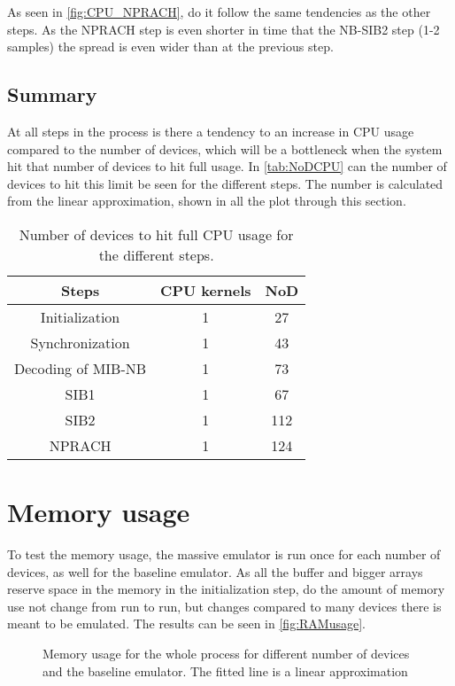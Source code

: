 As seen in \autoref{fig:CPU_NPRACH}, do it follow the same tendencies as the other steps. As the NPRACH step is even shorter in time that the  NB-SIB2 step (1-2 samples) the spread is even wider than at the previous step.

\subsection{Summary}
At all steps in the process is there a tendency to an increase in CPU usage compared to the number of devices, which will be a bottleneck when the system hit that number of devices to hit full usage. In \autoref{tab:NoDCPU} can the number of devices to hit this limit be seen for the different steps. The number is calculated from the linear approximation, shown in all the plot through this section.

\begin{table}[H]
\centering
\begin{tabular}{|c|c|c|}
\hline
Steps & CPU kernels & NoD \\
\hline
Initialization & 1 & 27 \\
\hline
Synchronization & 1 & 43 \\
\hline
Decoding of MIB-NB & 1 & 73 \\
\hline
SIB1 & 1 & 67 \\
\hline
SIB2 & 1 & 112 \\
\hline
NPRACH & 1 & 124 \\
\hline
\end{tabular}
\caption{Number of devices to hit full CPU usage for the different steps.}
\label{tab:NoDCPU}
\end{table}

\section{Memory usage}
To test the memory usage, the massive emulator is run once for each number of devices, as well for the baseline emulator. As all the buffer and bigger arrays reserve space in the memory in the initialization step, do the amount of memory use not change from run to run, but changes compared to many devices there is meant to be emulated. The results can be seen in \autoref{fig:RAMusage}.

\begin{figure}[H]
\centering
\resizebox{0.5\textwidth}{!}{
}
\caption{Memory usage for the whole process for different number of devices and the baseline emulator. The fitted line is a linear approximation}
\label{fig:RAMusage}
\end{figure}

